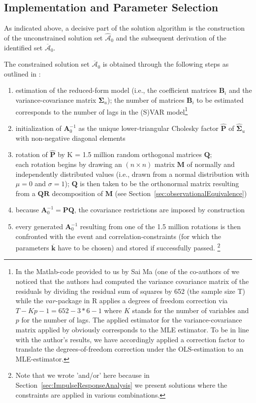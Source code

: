 \documentclass[a4paper,11pt,listof=nochaptergap,oneside,pointednumbers,bibtotoc,bigheadings,liststotoc,hidelinks]{scrbook}
\theoremstyle{mysatz}
\theoremstyle{mydefinition}
\theoremstyle{mytheorem}
\theoremstyle{mybemerkung}
\let\oldhat\hat
\newcommand{\vect}[1]{\boldsymbol{\mathbf{#1}}}
\newcommand{\hatt}[1]{\oldhat{\boldsymbol{\mathbf{#1}}}}
\begin{document}
\subsection{Implementation and Parameter Selection}
\label{sec:solutionAlgorithm}
As indicated above, a decisive part of the solution algorithm is the construction of the unconstrained solution set $\hatt{\mathcal{A}}_0$ and the subsequent derivation of the identified set $\overline{\vect{\mathcal{A}}}_0$.

The constrained solution set $\overline{\vect{\mathcal{A}}}_0$ is obtained through the following steps as outlined in \citet{ludvigsonetal:19}:
\begin{enumerate}[i]
	\item estimation of the reduced-form model (i.e., the coefficient matrices $\vect{B}_i$ and the variance-covariance matrix $\vect{\Sigma}_u$); the number of matrices $\vect{B}_i$ to be estimated corresponds to the number of lags in the (S)VAR model\footnote{In the Matlab-code provided to us by Sai Ma (one of the co-authors of \citet{ludvigsonetal:18, ludvigsonetal:19} we noticed that the authors had computed the variance covariance matrix of the residuals by dividing the residual sum of squares by 652 (the sample size T) while the $var$-package in R applies a degrees of freedom correction via $T-Kp-1 = 652 - 3*6 - 1$ where $K$ stands for the number of variables and $p$ for the number of lags. The applied estimator for the variance-covariance matrix applied by \citet{ludvigsonetal:18,ludvigsonetal:19} obviously corresponds to the MLE estimator. To be in line with the author's results, we have accordingly applied a correction factor to translate the degrees-of-freedom correction under the OLS-estimation to an MLE-estimator.\label{ftn:MatlabCodeFootnote}}
	\item initialization of $\vect{A}_0^{-1}$ as the unique lower-triangular Cholesky factor $\hatt{\vect{P}}$ of $\hatt{\vect{\Sigma}}_u$ with non-negative diagonal elements
	\item rotation of $\hatt{\vect{P}}$ by K = 1.5 million random orthogonal matrices $\vect{Q}$;\\
	 each rotation begins by drawing an $(n \times n)$ matrix $\vect{M}$ of normally and independently distributed values (i.e., drawn from a normal distribution with $\mu = 0$ and $\sigma = 1$); $\vect{Q}$ is then taken to be the orthonormal matrix resulting from a $\vect{Q}\vect{R}$ decomposition of $\vect{M}$ (see Section~\ref{sec:observationalEquivalence})
	 \item because $\vect{A}_0^{-1} = \vect{P}\vect{Q}$, the covariance restrictions are imposed by construction 
	 \item every generated $\vect{A}_0^{-1}$ resulting from one of the 1.5 million rotations is then confronted with the event and correlation-constraints (for which the parameters $\overline{\vect{k}}$ have to be chosen) and stored if successfully passed. \footnote{Note that we wrote 'and/or' here because in Section~\ref{sec:ImpulseResponseAnalysis} we present solutions where the constraints are applied in various combinations.}
\end{enumerate}
\end{document}
